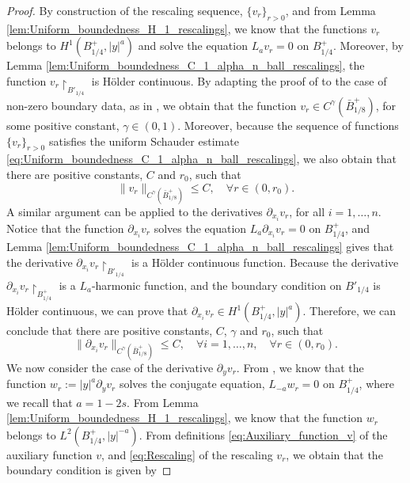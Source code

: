 \documentclass[11pt,reqno]{amsart}
\theoremstyle{definition}
\theoremstyle{remark}
\begin{document}
\begin{proof}
By construction of the rescaling sequence, $\{v_r\}_{r>0}$, and from Lemma \ref{lem:Uniform_boundedness_H_1_rescalings}, we know that the functions $v_r$ belongs to $H^1(B^+_{1/4},|y|^a)$ and solve the equation $L_a v_r=0$ on $B^+_{1/4}$. Moreover, by Lemma 
\ref{lem:Uniform_boundedness_C_1_alpha_n_ball_rescalings}, the function $v_r\upharpoonright_{B'_{1/4}}$ is H\"older continuous. By adapting the proof of \cite[Theorem 2.4.6]{Fabes_Kenig_Serapioni_1982a} to the case of non-zero boundary data, as in \cite[Theorem 8.27]{GilbargTrudinger}, we obtain that the function $v_r \in C^{\gamma}(\bar B^+_{1/8})$, for some positive constant, $\gamma\in (0,1)$. Moreover, because the sequence of functions $\{v_r\}_{r>0}$ satisfies the uniform Schauder estimate \eqref{eq:Uniform_boundedness_C_1_alpha_n_ball_rescalings}, we also obtain that there are positive constants, $C$ and $r_0$, such that
\begin{equation}
\label{eq:Holder_estimate_v_r}
\|v_r\|_{C^{\gamma}(\bar B^+_{1/8})} \leq C,\quad\forall r\in (0,r_0).
\end{equation}
A similar argument can be applied to the derivatives $\partial_{x_i} v_r$, for all $i=1,\ldots,n$. Notice that the function $\partial_{x_i} v_r$ solves the equation $L_a \partial_{x_i} v_r=0$ on $B^+_{1/4}$, and Lemma \ref{lem:Uniform_boundedness_C_1_alpha_n_ball_rescalings} gives that the derivative $\partial_{x_i} v_r\upharpoonright_{B'_{1/4}}$ is a H\"older continuous function. Because the derivative $\partial_{x_i} v_r\upharpoonright_{B^+_{1/4}}$ is a $L_a$-harmonic function, and the boundary condition on $B'_{1/4}$ is H\"older continuous, we can prove that $\partial_{x_i} v_r\in H^1(B^+_{1/4}, |y|^a)$. Therefore, we can conclude that
there are positive constants, $C$, $\gamma$ and $r_0$, such that
\begin{equation*}
\|\partial_{x_i} v_r\|_{C^{\gamma}(\bar B^+_{1/8})} \leq C,\quad \forall i =1,\ldots, n,\quad\forall r\in (0,r_0).
\end{equation*}
We now consider the case of the derivative $\partial_y v_r$. From \cite[\S 2.3]{Caffarelli_Silvestre_2007}, we know that the function $w_r:=|y|^a\partial_y v_r$ solves the conjugate equation, $L_{-a} w_r=0$ on $B^+_{1/4}$, where we recall that $a=1-2s$. From Lemma \ref{lem:Uniform_boundedness_H_1_rescalings}, we know that the function $w_r$ belongs to $L^2(B^+_{1/4}, |y|^{-a})$.  From definitions \eqref{eq:Auxiliary_function_v} of the auxiliary function $v$, and \eqref{eq:Rescaling} of the rescaling $v_r$, we obtain that the boundary condition is given by

\end{proof}
\end{document}
